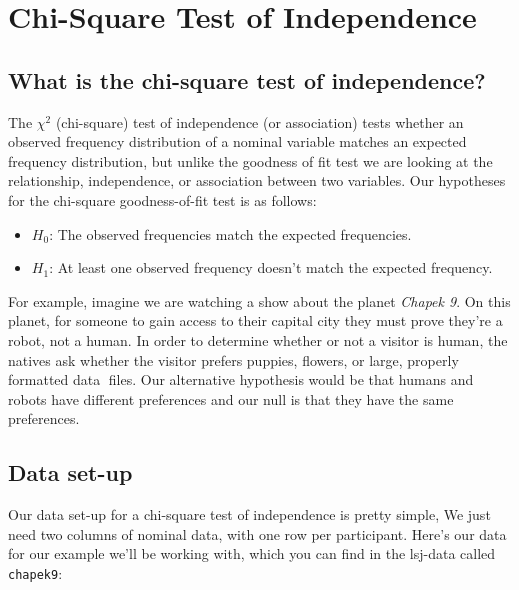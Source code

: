 \documentclass[
]{book}
\begin{document}
\hypertarget{chi-square-test-of-independence}{%
\chapter{Chi-Square Test of Independence}\label{chi-square-test-of-independence}}

\hypertarget{what-is-the-chi-square-test-of-independence}{%
\section{What is the chi-square test of independence?}\label{what-is-the-chi-square-test-of-independence}}

The \(\chi^2\) (chi-square) test of independence (or association) tests whether an observed frequency distribution of a nominal variable matches an expected frequency distribution, but unlike the goodness of fit test we are looking at the relationship, independence, or association between two variables. Our hypotheses for the chi-square goodness-of-fit test is as follows:

\begin{itemize}
\item
  \(H_0\): The observed frequencies match the expected frequencies.
\item
  \(H_1\): At least one observed frequency doesn't match the expected frequency.
\end{itemize}

For example, imagine we are watching a show about the planet \emph{Chapek 9}. On this planet, for someone to gain access to their capital city they must prove they're a robot, not a human. In order to determine whether or not a visitor is human, the natives ask whether the visitor prefers puppies, flowers, or large, properly formatted data files. Our alternative hypothesis would be that humans and robots have different preferences and our null is that they have the same preferences.

\hypertarget{data-set-up-6}{%
\section{Data set-up}\label{data-set-up-6}}

Our data set-up for a chi-square test of independence is pretty simple, We just need two columns of nominal data, with one row per participant. Here's our data for our example we'll be working with, which you can find in the lsj-data called \texttt{chapek9}:
\end{document}
